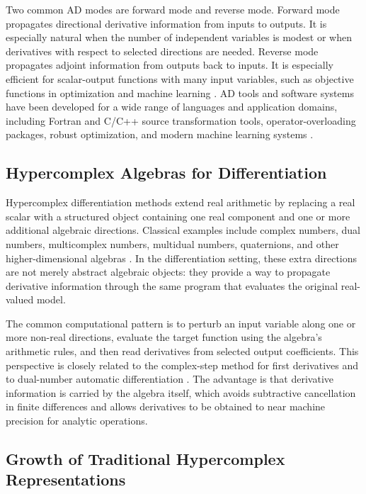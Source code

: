 \documentclass[11pt]{article}
\begin{document}
Two common AD modes are forward mode and reverse mode. Forward mode propagates
directional derivative information from inputs to outputs. It is especially
natural when the number of independent variables is modest or when derivatives
with respect to selected directions are needed. Reverse mode propagates
adjoint information from outputs back to inputs. It is especially efficient
for scalar-output functions with many input variables, such as objective
functions in optimization and machine learning \cite{Griewank2008,Baydin2015}.
AD tools and software systems have been developed for a wide range of
languages and application domains, including Fortran and C/C++ source
transformation tools, operator-overloading packages, robust optimization, and
modern machine learning systems
\cite{Bischof1996,Griewank1996,Hascoet2013,Su1997,Phipps2012,Abadi2016,Bradbury2018,Ansel2024}.

\subsection{Hypercomplex Algebras for Differentiation}

Hypercomplex differentiation methods extend real arithmetic by replacing a
real scalar with a structured object containing one real component and one or
more additional algebraic directions. Classical examples include complex
numbers, dual numbers, multicomplex numbers, multidual numbers, quaternions,
and other higher-dimensional algebras \cite{Kantor1989,Fischer2017}. In the
differentiation setting, these extra directions are not merely abstract
algebraic objects: they provide a way to propagate derivative information
through the same program that evaluates the original real-valued model.

The common computational pattern is to perturb an input variable along one or
more non-real directions, evaluate the target function using the algebra's
arithmetic rules, and then read derivatives from selected output
coefficients. This perspective is closely related to the complex-step method
for first derivatives and to dual-number automatic differentiation
\cite{Martins2003,Fischer2017}. The advantage is that derivative information
is carried by the algebra itself, which avoids subtractive cancellation in
finite differences and allows derivatives to be obtained to near machine
precision for analytic operations.

\subsection{Growth of Traditional Hypercomplex Representations}
\end{document}
